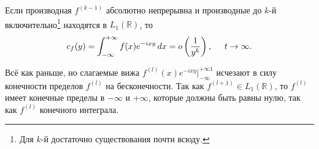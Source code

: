 

\begin{to_lem}
    Если производная $f^{(k-1)}$ абсолютно непрерывна и производные до $k$-й включительно\footnote{
        Для $k$-й достаточно существования почти всюду.
    }  находятся в $L_1 (\mathbb{R})$, то
    \begin{equation*}
        c_f (y) = \int_{-\infty}^{+\infty} f(x) e^{-ixy} \, d x = o \left(\frac{1}{y^k}\right),
        \hspace{5 mm}
        t \to \infty.
    \end{equation*}
    \label{lem8d43}
\end{to_lem}


\begin{uproof}
    Всё как раньше, но слагаемые вижа $f^{(l)} (x) e^{-ixy} |_{-\infty}^{+\infty1}$ исчезают в силу конечности пределов $f^{(l)}$ на бесконечности. Так как $f^{(l+1)} \in L_1 (\mathbb{R})$, то $f^{(l)}$ имеет конечные пределы в $-\infty$ и $+\infty$, которые должны быть равны нулю, так как $f^{(l)}$ конечного интеграла.
\end{uproof}
